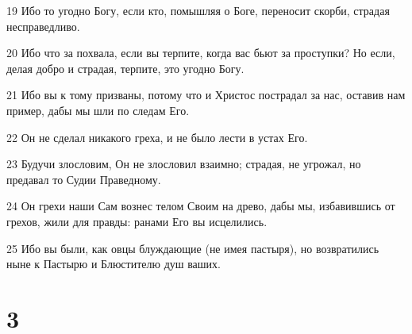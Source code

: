 \par 19 Ибо то угодно Богу, если кто, помышляя о Боге, переносит скорби, страдая несправедливо.
\par 20 Ибо что за похвала, если вы терпите, когда вас бьют за проступки? Но если, делая добро и страдая, терпите, это угодно Богу.
\par 21 Ибо вы к тому призваны, потому что и Христос пострадал за нас, оставив нам пример, дабы мы шли по следам Его.
\par 22 Он не сделал никакого греха, и не было лести в устах Его.
\par 23 Будучи злословим, Он не злословил взаимно; страдая, не угрожал, но предавал то Судии Праведному.
\par 24 Он грехи наши Сам вознес телом Своим на древо, дабы мы, избавившись от грехов, жили для правды: ранами Его вы исцелились.
\par 25 Ибо вы были, как овцы блуждающие (не имея пастыря), но возвратились ныне к Пастырю и Блюстителю душ ваших.

\chapter{3}

